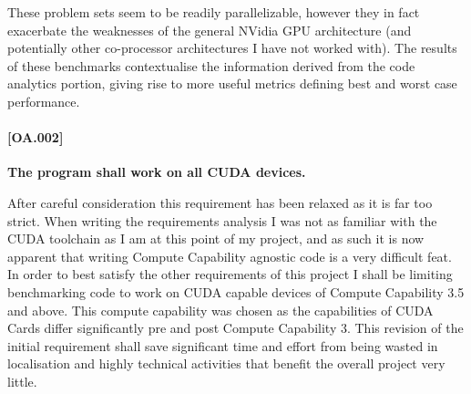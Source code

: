 These problem sets seem to be readily parallelizable, however they in fact exacerbate the weaknesses of the general NVidia GPU architecture (and potentially other co-processor architectures I have not worked with). The results of these benchmarks contextualise the information derived from the code analytics portion, giving rise to more useful metrics defining best and worst case performance.

\paragraph{[OA.002]}
\textbf{The program shall work on all CUDA devices.}

After careful consideration this requirement has been relaxed as it is far too strict. When writing the requirements analysis I was not as familiar with the CUDA toolchain as I am at this point of my project, and as such it is now apparent that writing Compute Capability agnostic code is a very difficult feat. In order to best satisfy the other requirements of this project I shall be limiting benchmarking code to work on CUDA capable devices of Compute Capability 3.5 and above. This compute capability was chosen as the capabilities of CUDA Cards differ significantly pre and post Compute Capability 3. This revision of the initial requirement shall save significant time and effort from being wasted in localisation and highly technical activities that benefit the overall project very little.

















